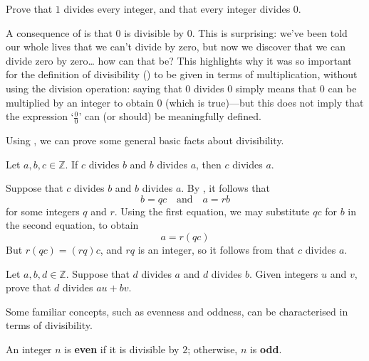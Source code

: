 \begin{exercise}
\label{exOneDividesEveryIntegerDividesZero}
Prove that $1$ divides every integer, and that every integer divides $0$.
\end{exercise}

A consequence of  is that $0$ is divisible by $0$. This is surprising: we've been told our whole lives that we can't divide by zero, but now we discover that we can divide zero by zero\dots{} how can that be? This highlights why it was so important for the definition of divisibility () to be given in terms of multiplication, without using the division operation: saying that $0$ divides $0$ simply means that $0$ can be multiplied by an integer to obtain $0$ (which is true)---but this does not imply that the expression `$\frac{0}{0}$' can (or should) be meaningfully defined.

Using , we can prove some general basic facts about divisibility.

\begin{proposition}
\label{propDivisibilityIsTransitive}
Let $a,b,c \in \mathbb{Z}$. If $c$ divides $b$ and $b$ divides $a$, then $c$ divides $a$.
\end{proposition}

\begin{cproof}
Suppose that $c$ divides $b$ and $b$ divides $a$. By , it follows that
\[ b=qc \quad \text{and} \quad a=rb \]
for some integers $q$ and $r$. Using the first equation, we may substitute $qc$ for $b$ in the second equation, to obtain
\[ a=r(qc) \]
But $r(qc) = (rq)c$, and $rq$ is an integer, so it follows from  that $c$ divides $a$.
\end{cproof}


\begin{exercise}
\label{exDivisibilityIsLinear}
Let $a,b,d \in \mathbb{Z}$. Suppose that $d$ divides $a$ and $d$ divides $b$. Given integers $u$ and $v$, prove that $d$ divides $au+bv$.
\end{exercise}

Some familiar concepts, such as evenness and oddness, can be characterised in terms of divisibility.

\begin{definition}
\label{defEvenOdd}
An integer $n$ is \textbf{even} if it is divisible by $2$; otherwise, $n$ is \textbf{odd}.
\end{definition}


